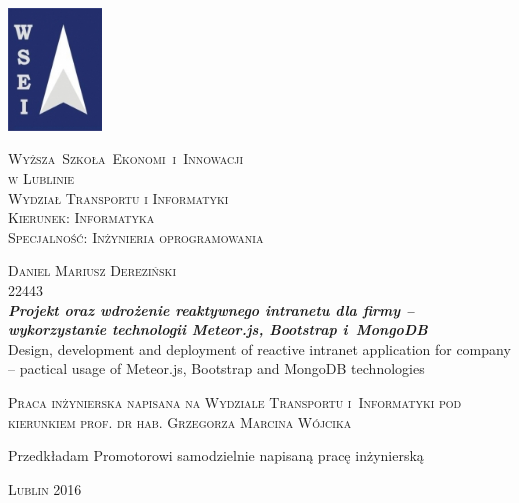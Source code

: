 \noindent

\begin{center}\small
\includegraphics[width=25mm]{./title/logowsei.jpg}
\end{center}

\begin{center}
{\LARGE\textsc{Wyższa~Szkoła~Ekonomi~i~Innowacji \\ w Lublinie}}\\[0.5cm]
{\Large\textsc{Wydział Transportu i Informatyki}}\\[0.5cm]
{\Large\textsc{Kierunek:  Informatyka}}\\[0.5cm]
{\Large\textsc{Specjalność: Inżynieria oprogramowania}}\\[0.5cm]
\end{center}


\begin{center}
\begin{large}
\textsc{Daniel Mariusz Dereziński} \\
22443 \\[0.5cm]

\huge{\bf{\it{Projekt oraz wdrożenie reaktywnego intranetu dla firmy -- wykorzystanie technologii Meteor.js, Bootstrap i~MongoDB}}} \\[0.3cm]
\small{Design, development and deployment of reactive intranet application for company -- pactical usage of Meteor.js, Bootstrap and MongoDB technologies}
\end{large}
\end{center}
\vspace{2.0cm}



\begin{flushright}
\begin{minipage}{7.4cm}
\begin{spacing}{1.0}
\textsc{Praca inżynierska napisana na Wydziale Transportu i~Informatyki pod kierunkiem prof. dr hab. Grzegorza Marcina Wójcika}
\end{spacing}
\end{minipage}
\end{flushright}
\vfill

\begin{flushleft}
\vspace{-4.5cm}
\begin{minipage}{7.4cm}
\begin{spacing}{1.0}
\small{Przedkładam Promotorowi samodzielnie napisaną pracę inżynierską}
\end{spacing}
\end{minipage}
\end{flushleft}
\vspace{2.5cm}
\vfill

\begin{center}
\textsc{Lublin 2016}
\end{center}
